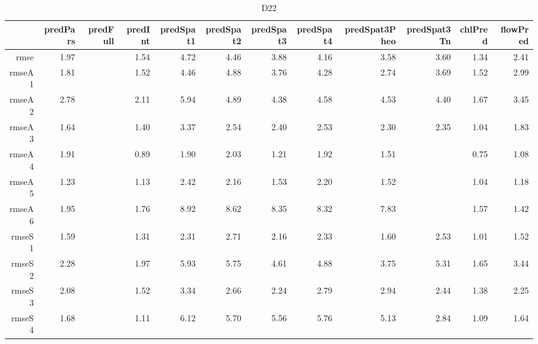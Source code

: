 \begin{table}[H]
\centering
\begingroup\fontsize{2.5pt}{4pt}\selectfont
\begin{tabular}{rrrrrrrrrrrr}
  \hline
 & predPars & predFull & predInt & predSpat1 & predSpat2 & predSpat3 & predSpat4 & predSpat3Pheo & predSpat3Tn & chlPred & flowPred \\ 
  \hline
rmse & 1.97 &  & 1.54 & 4.72 & 4.46 & 3.88 & 4.16 & 3.58 & 3.60 & 1.34 & 2.41 \\ 
  rmseA1 & 1.81 &  & 1.52 & 4.46 & 4.88 & 3.76 & 4.28 & 2.74 & 3.69 & 1.52 & 2.99 \\ 
  rmseA2 & 2.78 &  & 2.11 & 5.94 & 4.89 & 4.38 & 4.58 & 4.53 & 4.40 & 1.67 & 3.45 \\ 
  rmseA3 & 1.64 &  & 1.40 & 3.37 & 2.54 & 2.40 & 2.53 & 2.30 & 2.35 & 1.04 & 1.83 \\ 
  rmseA4 & 1.91 &  & 0.89 & 1.90 & 2.03 & 1.21 & 1.92 & 1.51 &  & 0.75 & 1.08 \\ 
  rmseA5 & 1.23 &  & 1.13 & 2.42 & 2.16 & 1.53 & 2.20 & 1.52 &  & 1.04 & 1.18 \\ 
  rmseA6 & 1.95 &  & 1.76 & 8.92 & 8.62 & 8.35 & 8.32 & 7.83 &  & 1.57 & 1.42 \\ 
  rmseS1 & 1.59 &  & 1.31 & 2.31 & 2.71 & 2.16 & 2.33 & 1.60 & 2.53 & 1.01 & 1.52 \\ 
  rmseS2 & 2.28 &  & 1.97 & 5.93 & 5.75 & 4.61 & 4.88 & 3.75 & 5.31 & 1.65 & 3.44 \\ 
  rmseS3 & 2.08 &  & 1.52 & 3.34 & 2.66 & 2.24 & 2.79 & 2.94 & 2.44 & 1.38 & 2.25 \\ 
  rmseS4 & 1.68 &  & 1.11 & 6.12 & 5.70 & 5.56 & 5.76 & 5.13 & 2.84 & 1.09 & 1.64 \\ 
   \hline
\end{tabular}
\endgroup
\caption{D22} 
\end{table}
